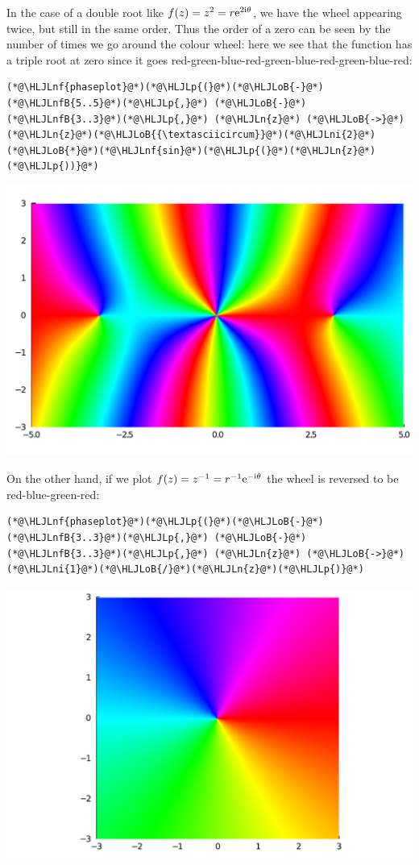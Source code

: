 \documentclass[12pt,a4paper]{article}
\newcommand{\HLJLn}[1]{#1}
\newcommand{\HLJLnf}[1]{\textcolor[RGB]{66,102,213}{#1}}
\newcommand{\HLJLnfB}[1]{\textcolor[RGB]{59,151,46}{#1}}
\newcommand{\HLJLni}[1]{\textcolor[RGB]{59,151,46}{#1}}
\newcommand{\HLJLoB}[1]{\textcolor[RGB]{102,102,102}{\textbf{#1}}}
\newcommand{\HLJLp}[1]{#1}
\def\I{ {\rm i} }
\def\E{ {\rm e} }
\begin{document}
In the case of a double root like $f(z) = z^2 = r \E^{2 \I \theta}$, we have the wheel appearing twice, but still in the same order. Thus the order of a zero can be seen by the number of times we go around the colour wheel: here we see that the function has a triple root at zero since it goes red-green-blue-red-green-blue-red-green-blue-red:


\begin{lstlisting}
(*@\HLJLnf{phaseplot}@*)(*@\HLJLp{(}@*)(*@\HLJLoB{-}@*)(*@\HLJLnfB{5..5}@*)(*@\HLJLp{,}@*) (*@\HLJLoB{-}@*)(*@\HLJLnfB{3..3}@*)(*@\HLJLp{,}@*) (*@\HLJLn{z}@*) (*@\HLJLoB{->}@*) (*@\HLJLn{z}@*)(*@\HLJLoB{{\textasciicircum}}@*)(*@\HLJLni{2}@*)(*@\HLJLoB{*}@*)(*@\HLJLnf{sin}@*)(*@\HLJLp{(}@*)(*@\HLJLn{z}@*)(*@\HLJLp{))}@*)
\end{lstlisting}

\includegraphics[width=\linewidth]{figures/Lecture1_8_1.pdf}

On the other hand, if we plot $f(z) = z^{-1} = r^{-1} \E^{-\I \theta}$ the wheel is reversed to  be red-blue-green-red:


\begin{lstlisting}
(*@\HLJLnf{phaseplot}@*)(*@\HLJLp{(}@*)(*@\HLJLoB{-}@*)(*@\HLJLnfB{3..3}@*)(*@\HLJLp{,}@*) (*@\HLJLoB{-}@*)(*@\HLJLnfB{3..3}@*)(*@\HLJLp{,}@*) (*@\HLJLn{z}@*) (*@\HLJLoB{->}@*) (*@\HLJLni{1}@*)(*@\HLJLoB{/}@*)(*@\HLJLn{z}@*)(*@\HLJLp{)}@*)
\end{lstlisting}

\includegraphics[width=\linewidth]{figures/Lecture1_9_1.pdf}
\end{document}
